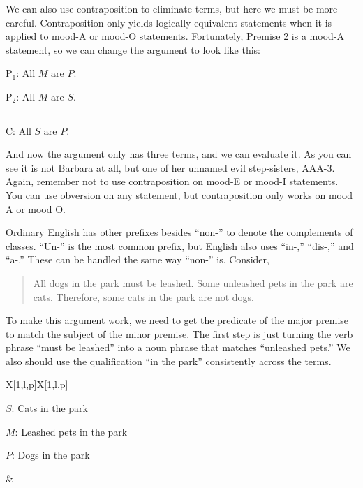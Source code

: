 {We can also use contraposition to eliminate terms, but here we must be more careful. Contraposition only yields logically equivalent statements when it is applied to mood-A or mood-O statements. Fortunately, Premise 2 is a mood-A statement, so we can change the argument to look like this:

\begin{earg}
\item[P$_1$:]  All $M$ are $P$.
\item[P$_2$:] All $M$ are $S$.
\vspace{-.5em}
\item [] \rule{0.2\linewidth}{.5pt} 
\item[C:] All $S$ are $P$.
\end{earg} 

And now the argument only has three terms, and we can evaluate it. As you can see it is not Barbara at all, but one of her unnamed evil step-sisters, AAA-3. Again, remember not to use contraposition on mood-E or mood-I statements. You can use obversion on any statement, but contraposition only works on mood A or mood O.  

Ordinary English has other prefixes besides ``non-'' to denote the complements of classes. ``Un-'' is the most common prefix, but English also uses ``in-,'' ``dis-,'' and ``a-.'' These can be handled the same way ``non-'' is. Consider,

\begin{quotation}
All dogs in the park must be leashed. Some unleashed pets in the park are cats. Therefore, some cats in the park are not dogs.
\end{quotation}

To make this argument work, we need to get the predicate of the major premise to match the subject of the minor premise. The first step is just turning the verb phrase ``must be leashed'' into a noun phrase that matches ``unleashed pets.'' We also should use the qualification ``in the park'' consistently across the terms. 

\begin{tabu}{{X[1,l,p]X[1,l,p]}}

\begin{ekey}
\item[$S$:] Cats in the park
\item[$M$:] Leashed pets in the park
\item[$P$:] Dogs in the park 
\end{ekey}

&


\end{tabu}}
